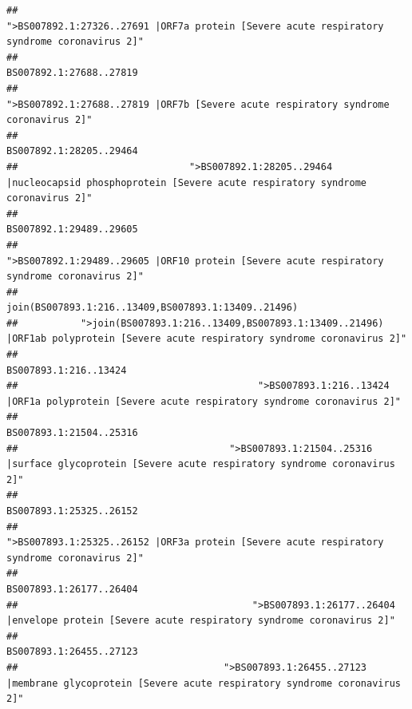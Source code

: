 \documentclass[
]{article}
\begin{document}
\begin{verbatim}
##                                            ">BS007892.1:27326..27691 |ORF7a protein [Severe acute respiratory syndrome coronavirus 2]" 
##                                                                                                                BS007892.1:27688..27819 
##                                                    ">BS007892.1:27688..27819 |ORF7b [Severe acute respiratory syndrome coronavirus 2]" 
##                                                                                                                BS007892.1:28205..29464 
##                              ">BS007892.1:28205..29464 |nucleocapsid phosphoprotein [Severe acute respiratory syndrome coronavirus 2]" 
##                                                                                                                BS007892.1:29489..29605 
##                                            ">BS007892.1:29489..29605 |ORF10 protein [Severe acute respiratory syndrome coronavirus 2]" 
##                                                                                    join(BS007893.1:216..13409,BS007893.1:13409..21496) 
##           ">join(BS007893.1:216..13409,BS007893.1:13409..21496) |ORF1ab polyprotein [Severe acute respiratory syndrome coronavirus 2]" 
##                                                                                                                  BS007893.1:216..13424 
##                                          ">BS007893.1:216..13424 |ORF1a polyprotein [Severe acute respiratory syndrome coronavirus 2]" 
##                                                                                                                BS007893.1:21504..25316 
##                                     ">BS007893.1:21504..25316 |surface glycoprotein [Severe acute respiratory syndrome coronavirus 2]" 
##                                                                                                                BS007893.1:25325..26152 
##                                            ">BS007893.1:25325..26152 |ORF3a protein [Severe acute respiratory syndrome coronavirus 2]" 
##                                                                                                                BS007893.1:26177..26404 
##                                         ">BS007893.1:26177..26404 |envelope protein [Severe acute respiratory syndrome coronavirus 2]" 
##                                                                                                                BS007893.1:26455..27123 
##                                    ">BS007893.1:26455..27123 |membrane glycoprotein [Severe acute respiratory syndrome coronavirus 2]" 

\end{verbatim}
\end{document}
